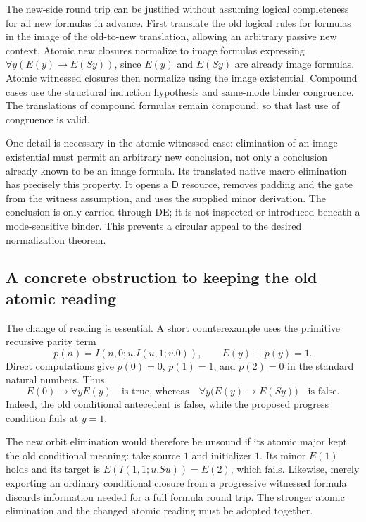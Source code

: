 \documentclass[11pt,a4paper]{article}
\theoremstyle{definition}
\begin{document}
The new-side round trip can be justified without assuming logical
completeness for all new formulas in advance.  First translate the old
logical rules for formulas in the image of the old-to-new translation,
allowing an arbitrary passive new context.  Atomic new closures normalize
to image formulas expressing
$\forall y(E(y)\mathbin{\to}E(Sy))$, since $E(y)$ and $E(Sy)$ are
already image formulas.  Atomic witnessed closures then normalize using
the image existential.  Compound cases use the structural induction
hypothesis and same-mode binder congruence.  The translations of compound
formulas remain compound, so that last use of congruence is valid.

One detail is necessary in the atomic witnessed case: elimination of an
image existential must permit an arbitrary new conclusion, not only a
conclusion already known to be an image formula.  Its translated native
macro elimination has precisely this property.  It opens a $\mathsf D$
resource, removes padding and the gate from the witness assumption, and
uses the supplied minor derivation.  The conclusion is only carried
through DE; it is not inspected or introduced beneath a mode-sensitive
binder.  This prevents a circular appeal to the desired normalization
theorem.

\subsection{A concrete obstruction to keeping the old atomic reading}

The change of reading is essential.  A short counterexample uses the
primitive recursive parity term
\[
 p(n)=I(n,0;u.I(u,1;v.0)),\qquad E(y)\equiv p(y)=1.
\]
Direct computations give $p(0)=0$, $p(1)=1$, and $p(2)=0$ in the
standard natural numbers.  Thus
\[
 E(0)\to\forall y E(y)
 \quad\text{is true, whereas}\quad
 \forall y\bigl(E(y)\to E(Sy)\bigr)
 \quad\text{is false}.
\]
Indeed, the old conditional antecedent is false, while the proposed
progress condition fails at $y=1$.

The new orbit elimination would therefore be unsound if its atomic major
kept the old conditional meaning: take source $1$ and initializer $1$.
Its minor $E(1)$ holds and its target is $E(I(1,1;u.Su))=E(2)$, which
fails.  Likewise, merely exporting an ordinary conditional closure from a
progressive witnessed formula discards information needed for a full
formula round trip.  The stronger atomic elimination and the changed
atomic reading must be adopted together.
\end{document}
